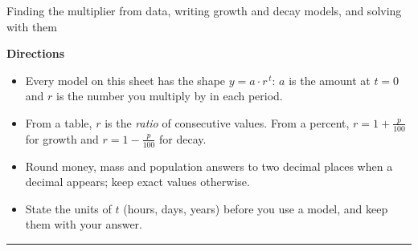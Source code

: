 \documentclass[12pt]{article}
\begin{document}

\begin{center}
\small Finding the multiplier from data, writing growth and decay models, and solving with them
\end{center}
\vspace{0.15cm}

\noindent\textbf{Directions}
\begin{itemize}[leftmargin=0.8cm, itemsep=1pt, topsep=2pt]
  \item Every model on this sheet has the shape $y = a \cdot r^{\,t}$: $a$ is the amount at $t = 0$ and $r$ is the number you multiply by in each period.
  \item From a table, $r$ is the \emph{ratio} of consecutive values. From a percent, $r = 1 + \frac{p}{100}$ for growth and $r = 1 - \frac{p}{100}$ for decay.
  \item Round money, mass and population answers to two decimal places when a decimal appears; keep exact values otherwise.
  \item State the units of $t$ (hours, days, years) before you use a model, and keep them with your answer.
\end{itemize}

\vspace{0.2cm}
\noindent\rule{\linewidth}{0.4pt}

\end{document}
